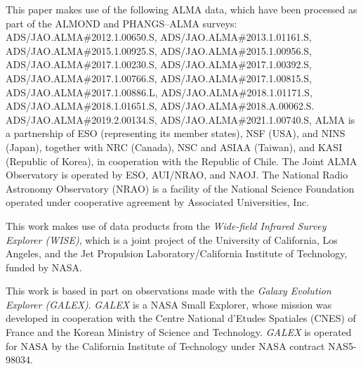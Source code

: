 \documentclass[letter, longauth]{aa} %
\begin{document}
\begin{acknowledgements}
This paper makes use of the following ALMA data, which have been processed as part of the ALMOND and PHANGS--ALMA surveys: \\
\noindent ADS/JAO.ALMA\#2012.1.00650.S, \linebreak %
ADS/JAO.ALMA\#2013.1.01161.S, \linebreak %
ADS/JAO.ALMA\#2015.1.00925.S, \linebreak %
ADS/JAO.ALMA\#2015.1.00956.S, \linebreak %
ADS/JAO.ALMA\#2017.1.00230.S, \linebreak %
ADS/JAO.ALMA\#2017.1.00392.S, \linebreak %
ADS/JAO.ALMA\#2017.1.00766.S, \linebreak %
ADS/JAO.ALMA\#2017.1.00815.S, \linebreak %
ADS/JAO.ALMA\#2017.1.00886.L, \linebreak %
ADS/JAO.ALMA\#2018.1.01171.S, \linebreak %
ADS/JAO.ALMA\#2018.1.01651.S, \linebreak %
ADS/JAO.ALMA\#2018.A.00062.S. \linebreak %
ADS/JAO.ALMA\#2019.2.00134.S, \linebreak %
ADS/JAO.ALMA\#2021.1.00740.S, \linebreak %
ALMA is a partnership of ESO (representing its member states), NSF (USA), and NINS (Japan), together with NRC (Canada), NSC and ASIAA (Taiwan), and KASI (Republic of Korea), in cooperation with the Republic of Chile. The Joint ALMA Observatory is operated by ESO, AUI/NRAO, and NAOJ. The National Radio Astronomy Observatory (NRAO) is a facility of the National Science Foundation operated under cooperative agreement by Associated Universities, Inc.

This work makes use of data products from the \textit{Wide-field Infrared Survey Explorer (WISE)}, which is a joint project of the University of California, Los Angeles, and the Jet Propulsion Laboratory/California Institute of Technology, funded by NASA.

This work is based in part on observations made with the \textit{Galaxy Evolution Explorer (GALEX)}. \textit{GALEX} is a NASA Small Explorer, whose mission was developed in cooperation with the Centre National d'Etudes Spatiales (CNES) of France and the Korean Ministry of Science and Technology. \textit{GALEX} is operated for NASA by the California Institute of Technology under NASA contract NAS5-98034.

\end{acknowledgements}
\end{document}
